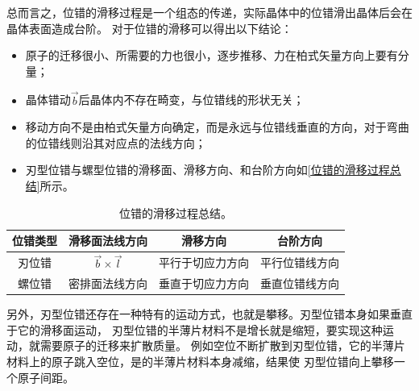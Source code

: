                 总而言之，位错的滑移过程是一个组态的传递，实际晶体中的位错滑出晶体后会在晶体表面造成台阶。
                对于位错的滑移可以得出以下结论：
                \begin{itemize}
                    \item 原子的迁移很小、所需要的力也很小，逐步推移、力在柏式矢量方向上要有分量；
                    \item 晶体错动$\vec{b}$后晶体内不存在畸变，与位错线的形状无关；
                    \item 移动方向不是由柏式矢量方向确定，而是永远与位错线垂直的方向，对于弯曲的位错线则沿其对应点的法线方向；
                    \item 刃型位错与螺型位错的滑移面、滑移方向、和台阶方向如\autoref{位错的滑移过程总结}所示。
                \end{itemize}

                \begin{table}[ht]
                    \centering
                    \caption{位错的滑移过程总结。}
                    \label{位错的滑移过程总结}
                    \begin{tabular}{@{}cccc@{}}
                        \toprule
                        位错类型 & 滑移面法线方向                & 滑移方向     & 台阶方向     \\ \midrule
                        刃位错  & $\vec{b}\times\vec{l}$ & 平行于切应力方向 & 平行位错线方向  \\
                        螺位错  & 密排面法线方向                & 垂直于切应力方向 & 垂直位错线方向 \\ \bottomrule
                    \end{tabular}
                \end{table}

                另外，刃型位错还存在一种特有的运动方式，也就是攀移。刃型位错本身如果垂直于它的滑移面运动，
                刃型位错的半薄片材料不是增长就是缩短，要实现这种运动，就需要原子的迁移来扩散质量。
                例如空位不断扩散到刃型位错，它的半薄片材料上的原子跳入空位，是的半薄片材料本身减缩，结果使
                刃型位错向上攀移一个原子间距。

